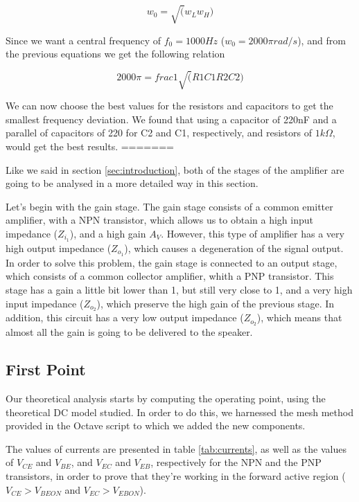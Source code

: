 \begin{equation}
	w_{0} = \sqrt(w_L w_H)
\end{equation}

\Par Since we want a central frequency of $f_0 = 1000 Hz$ ($w_0 = 2000\pi rad/s$), and from the previous equations we get the following relation

\begin{equation}
	2000\pi = frac{1}{\sqrt(R1C1R2C2)}
\end{equation}

\par We can now choose the best values for the resistors and capacitors to get the smallest frequency deviation. We found that using a capacitor of 220nF and a parallel of capacitors of 220 for C2 and C1, respectively, and resistors of $1k\Omega$, would get the best results.
=======
\par Like we said in section \ref{sec:introduction}, both of the stages of the amplifier are going to be analysed in a more detailed way in this section.
\par Let's begin with the gain stage. The gain stage consists of a common emitter amplifier, with a NPN transistor, which allows us to obtain a high input impedance ($Z_{i_1}$), and a high gain $A_V$. However, this type of amplifier has a very high output impedance ($Z_{o_1}$), which causes a degeneration of the signal output. In order to solve this problem, the gain stage is connected to an output stage, which consists of a common collector amplifier, whith a PNP transistor. This stage has a gain a little bit lower than 1, but still very close to 1, and a very high input impedance ($Z_{o_2}$), which preserve the high gain of the previous stage. In addition, this circuit has a very low output impedance ($Z_{o_2}$), which means that almost all the gain is going to be delivered to the speaker.

\subsection{First Point}

\par Our theoretical analysis starts by computing the operating point, using the theoretical DC model studied. In order to do this, we harnessed the mesh method provided in the Octave script to which we added the new components.
\par The values of currents are presented in table \ref{tab:currents}, as well as the values of $V_{CE}$ and $V_{BE}$, and $V_{EC}$ and $V_{EB}$, respectively for the NPN and the PNP transistors, in order to prove that they're working in the forward active region ($V_{CE} > V_{BEON}$ and $V_{EC} > V_{EBON}$).

